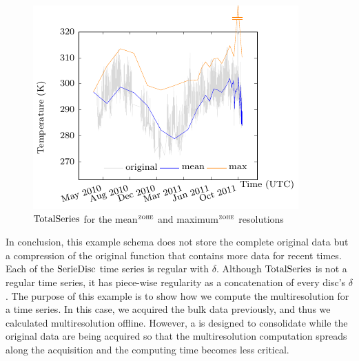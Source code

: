 \begin{figure}[tp]
  \centering
  \includegraphics{fig_exemple_4mrdtot.pdf}
  \caption{$\operatorname{TotalSeries}$ for the mean$^{\zohe}$ and maximum$^{\zohe}$
    resolutions}
  \label{fig:exemple:4mrdtot}
\end{figure}

In conclusion, this  example schema does not store the
complete original data but a compression of the original function that
contains more data for recent times.  Each of the $\operatorname{SerieDisc}$ time
series is regular with $\delta$. Although $\operatorname{TotalSeries}$ is not a
regular time series, it has piece-wise regularity as a concatenation
of every disc's $\delta$.  The purpose of this example is to show how
we compute the multiresolution for a time series. In this case, we
acquired the bulk data previously, and thus we calculated
multiresolution offline. However, a  is designed to
consolidate while the original data are being acquired so that the
multiresolution computation spreads along the acquisition and the
computing time becomes less critical.


